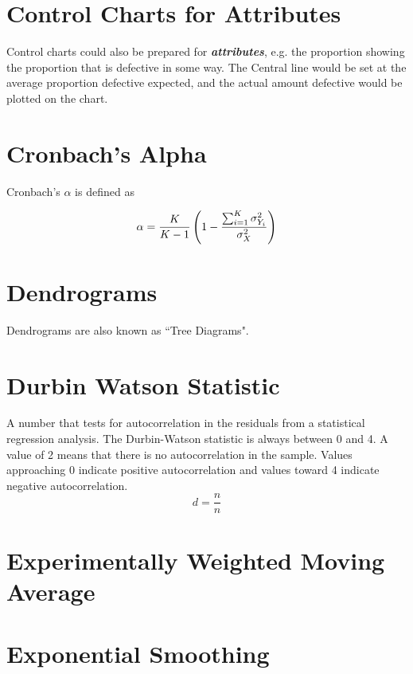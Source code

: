 \begin{enumerate}
\section{Control Charts for Attributes}

Control charts could also be prepared for \emph{\textbf{attributes}}, e.g. the proportion
showing the proportion that is defective in some way.
The Central line would be set at the average proportion defective expected, and
the actual amount defective would be plotted on the chart.
\section{Cronbach's Alpha}

Cronbach's $\alpha$ is defined as

\[
\alpha = {K \over K-1 } \left(1 - {\sum_{i=1}^K \sigma^2_{Y_i}\over \sigma^2_X}\right)
\]



\section{Dendrograms}
Dendrograms are also known as ``Tree Diagrams".
\section{Durbin Watson Statistic}

A number that tests for autocorrelation in the residuals from a statistical regression analysis. The Durbin-Watson statistic is always between 0 and 4. A value of 2 means that there is no autocorrelation in the sample. Values approaching 0 indicate positive autocorrelation and values toward 4 indicate negative autocorrelation.
\begin{equation}
d = \frac{n}{n}
\end{equation}
\section{Experimentally Weighted Moving Average}




\section{Exponential Smoothing}


\end{enumerate}
